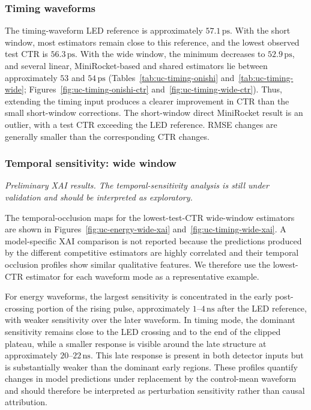 \subsubsection{Timing waveforms}
The timing-waveform LED reference is approximately $57.1\,\mathrm{ps}$.
With the short window, most estimators remain close to this reference,
and the lowest observed test CTR is $56.3\,\mathrm{ps}$. With the wide
window, the minimum decreases to $52.9\,\mathrm{ps}$, and several linear,
MiniRocket-based and shared estimators lie between approximately
$53$ and $54\,\mathrm{ps}$
(Tables~\ref{tab:uc-timing-onishi} and~\ref{tab:uc-timing-wide};
Figures~\ref{fig:uc-timing-onishi-ctr} and~\ref{fig:uc-timing-wide-ctr}).
Thus, extending the timing input produces a clearer improvement in CTR
than the small short-window corrections. The short-window direct
MiniRocket result is an outlier, with a test CTR exceeding the LED
reference. RMSE changes are generally smaller than the corresponding
CTR changes.




\subsubsection{Temporal sensitivity: wide window}
\textit{Preliminary XAI results. The temporal-sensitivity analysis is
still under validation and should be interpreted as exploratory.}

The temporal-occlusion maps for the lowest-test-CTR wide-window
estimators are shown in Figures~\ref{fig:uc-energy-wide-xai}
and~\ref{fig:uc-timing-wide-xai}. A model-specific XAI comparison
is not reported because the predictions produced by the different
competitive estimators are highly correlated and their temporal
occlusion profiles show similar qualitative features. We
therefore use the lowest-CTR estimator for each waveform mode as a
representative example.

For energy waveforms, the largest sensitivity is concentrated in the
early post-crossing portion of the rising pulse, approximately
$1$--$4\,\mathrm{ns}$ after the LED reference, with weaker sensitivity
over the later waveform. In timing mode, the dominant sensitivity remains
close to the LED crossing and to the end of the clipped plateau, while a
smaller response is visible around the late structure at approximately
$20$--$22\,\mathrm{ns}$. This late response is present in both detector
inputs but is substantially weaker than the dominant early regions.
These profiles quantify changes in model predictions under replacement
by the control-mean waveform and should therefore be interpreted as
perturbation sensitivity rather than causal attribution.

